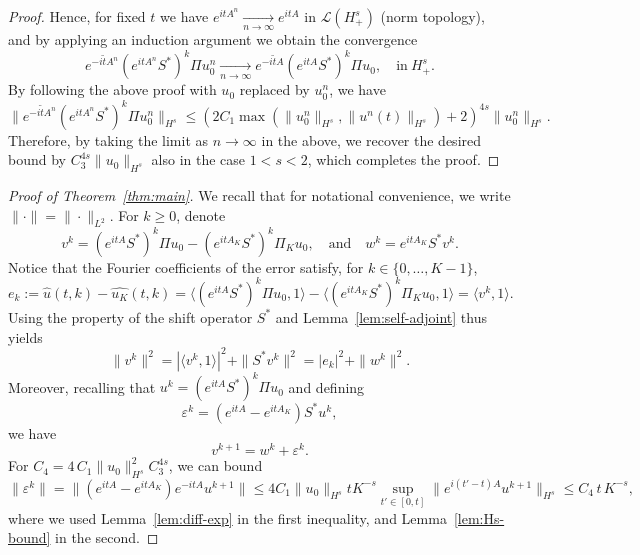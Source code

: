 \documentclass [11pt] {article}
\begin{document}
\begin{proof}
Hence, for fixed $t$ we have  $e^{itA^n} \underset{n \rightarrow \infty}{\longrightarrow} e^{itA}$ in $\mathcal{L}(H_{+}^s)$ (norm topology), and by applying an induction argument we obtain the convergence 
\[
e^{-i\tilde t A^n}(e^{itA^n}S^*)^k \Pi u_0^n \underset{n \rightarrow \infty}{\longrightarrow}  e^{-i\tilde t A}(e^{itA}S^*)^k\Pi u_0, \quad \text{in} \ H_{+}^s.
\]
By following the above proof with $u_0$ replaced by $u_0^n$, we have
\[
\|e^{-i\tilde t A^n}(e^{itA^n}S^*)^k \Pi u_0^n\|_{H^s} \leq (2C_1\max(\|u_0^n\|_{H^s},\|u^n(t)\|_{H^s})+2)^{4s}\|u_0^n\|_{H^s}.
\]
Therefore, by taking the limit as $n\rightarrow \infty$ in the above, we recover the desired bound by $C_3^{4s}\|u_0\|_{H^s}$ also in the case $1<s< 2$, which completes the proof.
\end{proof}

\begin{proof}[Proof of Theorem~\ref{thm:main}]
We recall that for notational convenience, we write $\|\cdot\|=\|\cdot\|_{L^2}$.
For $k\geq 0$, denote
\[
v^k=(e^{itA}S^*)^k\Pi u_0- (e^{itA_K}S^*)^k\Pi_K u_0,\quad \text{and} \quad w^k=e^{itA_K}S^*v^k.
\]
Notice that the Fourier coefficients of the error satisfy, for $k\in \{0,\dots,K-1\}$,
\[
e_k:=\widehat u(t,k) - \widehat{u_K}(t,k)
=\langle(e^{itA}S^*)^k\Pi u_0,1\rangle - \langle(e^{itA_K}S^*)^k\Pi_K u_0,1\rangle
=\langle v^k,1\rangle.
\]
Using the property of the shift operator $S^*$ and Lemma~\ref{lem:self-adjoint} thus yields
\begin{equation}
\label{eq:vkv0wk}
\|v^k\|^2=|\langle v^k,1\rangle|^2+\|S^*v^k\|^2
=|e_k|^2 +\|w^k\|^2.
\end{equation}
Moreover, recalling that $u^k=(e^{itA}S^*)^{k}\Pi u_0$ and defining
\[
\varepsilon^k=(e^{itA}-e^{itA_K})S^*u^k,
\]
we have
\begin{equation}
\label{eq:decompErr}
v^{k+1}=w^k+\varepsilon^{k}.
\end{equation}
For $C_4= 4\,C_1\|u_0\|_{H^s}^2C_3^{4s}$, we can bound
\[
\|\varepsilon^k\|=\|(e^{itA}-e^{itA_K})e^{-itA}u^{k+1}\| \leq 4C_1\|u_0\|_{H^s} tK^{-s}\sup_{t'\in [0,t]}\|e^{i(t'-t)A}u^{k+1}\|_{H^s} \leq C_4\,t\,K^{-s},
\]
where we used Lemma~\ref{lem:diff-exp} in the first inequality, and Lemma~\ref{lem:Hs-bound} in the second.


\end{proof}
\end{document}

